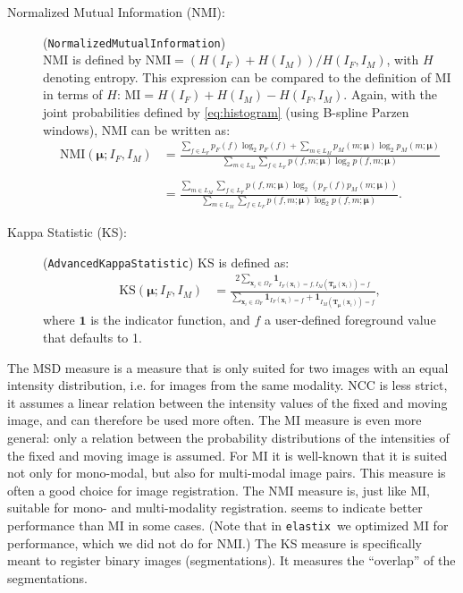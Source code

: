 \documentclass[]{report}
\newcommand{\elastix}{\texttt{elastix}}
\newcommand{\vx}{\bm{x}}
\newcommand{\vmu}{\bm{\mu}}
\newcommand{\vT}{\bm{T}}
\begin{document}
\begin{description}
\item[Normalized Mutual Information (NMI):]
(\texttt{NormalizedMutualInformation})\\ NMI is defined by
$\mathrm{NMI} = ( H(I_F) + H(I_M) ) / H(I_F,I_M)$, with $H$
denoting entropy. This expression can be compared to the
definition of MI in terms of $H$: $\mathrm{MI} = H(I_F) + H(I_M) -
H(I_F,I_M)$. Again, with the joint probabilities defined by
\ref{eq:histogram} (using B-spline Parzen windows), NMI can be
written as:
\begin{align}
\mathrm{NMI}(\vmu; I_F, I_M) &=
 \frac{\sum\limits_{f\in L_F} p_F(f)
 \log_2 p_F(f) + \sum\limits_{m\in L_M} p_M(m;\vmu) \log_2 p_M(m;\vmu)}
 { \sum\limits_{m\in L_M} \sum\limits_{f\in L_F}
 p(f,m;\vmu) \log_2 p(f,m;\vmu)} \nonumber \\ \nonumber \\
 &= \frac{\sum\limits_{m\in L_M} \sum\limits_{f\in L_F} p(f,m;\vmu) \log_2
 \left( p_F(f) p_M(m;\vmu) \right)}{ \sum\limits_{m\in L_M} \sum\limits_{f\in L_F}
 p(f,m;\vmu) \log_2 p(f,m;\vmu) }. \label{eq:NMI}
\end{align}

\item[Kappa Statistic (KS):] (\texttt{AdvancedKappaStatistic})
KS is defined as:
\begin{align}
\mathrm{KS}(\vmu;I_F,I_M) &= \frac{ 2 \sum\limits_{\vx_i \in
\Omega_F} \mathbf{1}_{I_F(\vx_i) = f, I_M(\vT_{\vmu}(\vx_i)) =
f}}{\sum\limits_{\vx_i \in \Omega_F} \mathbf{1}_{I_F(\vx_i) = f} +
\mathbf{1}_{I_M(\vT_{\vmu}(\vx_i)) = f}}, \label{eq:KS}
\end{align}
where $\mathbf{1}$ is the indicator function, and $f$ a user-defined
foreground value that defaults to 1.

\end{description}

The MSD measure is a measure that is only suited for two images with
an equal intensity distribution, i.e. for images from the same
modality. NCC is less strict, it assumes a linear relation between
the intensity values of the fixed and moving image, and can
therefore be used more often. The MI measure is even more general:
only a relation between the probability distributions of the
intensities of the fixed and moving image is assumed. For MI it is
well-known that it is suited not only for mono-modal, but also for
multi-modal image pairs. This measure is often a good choice for
image registration. The NMI measure is, just like MI, suitable for
mono- and multi-modality registration. \cite{Stu99:NMI} seems to
indicate better performance than MI in some cases. (Note that in
\elastix\ we optimized MI for performance, which we did not do for
NMI.) The KS measure is specifically meant to register binary images
(segmentations). It measures the ``overlap'' of the segmentations.
\end{document}
